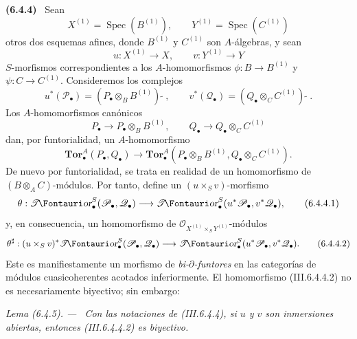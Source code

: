 \documentclass[10pt,oneside]{book}
\makeatletter
\newcommand{\sh}[1]{\mathscr{#1}}
\newcommand*{\ega@sheafop}[3]{\sh{#1}#2\textup{\kern-2.2pt{\Fontauri\slshape #3}}}
\newcommand{\shTor}{\ega@sheafop{T}{}{or}}
\newcommand{\vphi}{\phi}
\newcommand{\supertilde}{{\,\widetilde{\,}\,}}
\newcommand{\Spec}{\operatorname{Spec}}
\newcommand{\sref}[2][]{\textup{(#2)}}
\newcommand{\oldpage}[2][]{\setcounter{footnote}{0}\marginpar{\scriptsize\textbf{#1}~|~#2}\ignorespaces}
\newenvironment{env}[1][]{\par\medskip\noindent\textbf{(#1)}\ }{\par}
\newenvironment{lemma}[1][]{\par\medskip\noindent\itshape Lema (#1). ---\ }{\par}
\makeatother
\begin{document}
\begin{env}[6.4.4]
\label{III.6.4.4}
Sean
\[
  X^{(1)}=\Spec(B^{(1)}),
  \qquad
  Y^{(1)}=\Spec(C^{(1)})
\]
otros dos esquemas afines, donde $B^{(1)}$ y $C^{(1)}$ son
$A$-álgebras, y sean
\oldpage[III]{147}
\[
  u:X^{(1)}\longrightarrow X,
  \qquad
  v:Y^{(1)}\longrightarrow Y
\]
$S$-morfismos correspondientes a los $A$-homomorfismos
$\vphi:B\longrightarrow B^{(1)}$ y
$\psi:C\longrightarrow C^{(1)}$. Consideremos los complejos
\[
  u^*(\sh P_\bullet)
  =
  (P_\bullet\otimes_BB^{(1)})\supertilde,
  \qquad
  v^*(\sh Q_\bullet)
  =
  (Q_\bullet\otimes_CC^{(1)})\supertilde.
\]
Los $A$-homomorfismos canónicos
\[
  P_\bullet\longrightarrow P_\bullet\otimes_BB^{(1)},
  \qquad
  Q_\bullet\longrightarrow Q_\bullet\otimes_CC^{(1)}
\]
dan, por funtorialidad, un $A$-homomorfismo
\[
  \mathbf{Tor}_\bullet^A(P_\bullet,Q_\bullet)
  \longrightarrow
  \mathbf{Tor}_\bullet^A
  (P_\bullet\otimes_BB^{(1)},
   Q_\bullet\otimes_CC^{(1)}).
\]
De nuevo por funtorialidad, se trata en realidad de un homomorfismo
de $(B\otimes_AC)$-módulos. Por tanto, define un
$(u\times_Sv)$-morfismo
\[
  \theta:
  \boldsymbol{\shTor}_\bullet^S(\sh P_\bullet,\sh Q_\bullet)
  \longrightarrow
  \boldsymbol{\shTor}_\bullet^S(u^*\sh P_\bullet,v^*\sh Q_\bullet),
  \tag{6.4.4.1}\label{III.6.4.4.1}
\]
y, en consecuencia, un homomorfismo de
$\sh O_{X^{(1)}\times_SY^{(1)}}$-módulos
\[
  \theta^\sharp:
  (u\times_Sv)^*
  \boldsymbol{\shTor}_\bullet^S(\sh P_\bullet,\sh Q_\bullet)
  \longrightarrow
  \boldsymbol{\shTor}_\bullet^S(u^*\sh P_\bullet,v^*\sh Q_\bullet).
  \tag{6.4.4.2}\label{III.6.4.4.2}
\]
Este es manifiestamente un morfismo de \emph{bi-$\partial$-funtores} en
las categorías de módulos cuasicoherentes acotados inferiormente.
El homomorfismo \sref{III.6.4.4.2} no es necesariamente biyectivo;
sin embargo:
\end{env}

\begin{lemma}[6.4.5]
\label{III.6.4.5}
Con las notaciones de \sref{III.6.4.4}, si $u$ y $v$ son
inmersiones abiertas, entonces \sref{III.6.4.4.2} es biyectivo.
\end{lemma}
\end{document}
